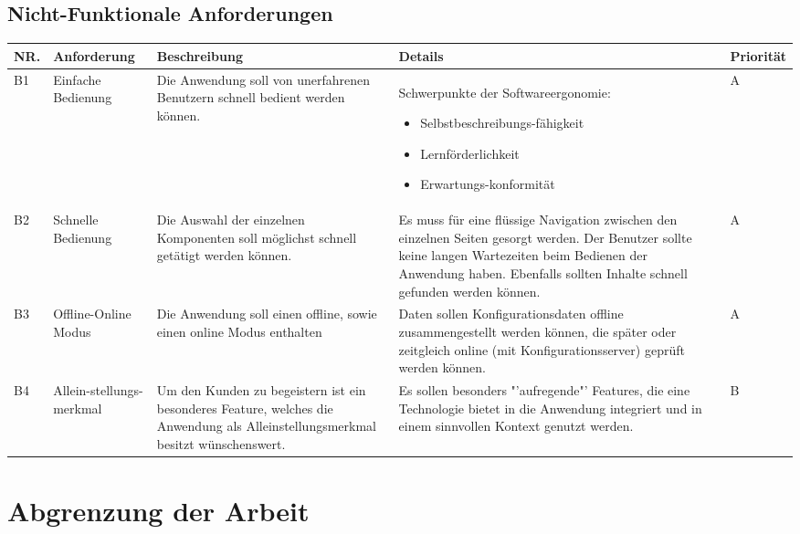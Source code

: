 \subsection{Nicht-Funktionale Anforderungen}
\begin{tabular}[H]{| p{0.5cm} | p{2.2cm} | p{4.5cm} | p{5.3cm} | p{1.3cm} |}
\toprule[2pt] \rowcolor{dunkelgrau}
\hline
  NR. & Anforderung & Beschreibung & Details & Priorität \\
  \hline
  B1 & Einfache \newline Bedienung & Die Anwendung soll von unerfahrenen Benutzern schnell bedient werden können.& Schwerpunkte der Softwareergonomie\cite{bib:softwareErgonomie}: 
  \begin{itemize}
        \item Selbstbeschreibungs-fähigkeit
        \item Lernförderlichkeit
        \item Erwartungs-konformität
     \end{itemize}
   & A \\
  \hline
  B2 & Schnelle Bedienung & Die Auswahl der einzelnen Komponenten soll möglichst schnell getätigt werden können. & Es muss für eine flüssige Navigation zwischen den einzelnen Seiten gesorgt werden. Der Benutzer sollte keine langen Wartezeiten beim Bedienen der Anwendung haben. Ebenfalls sollten Inhalte schnell gefunden werden können. & A \\
  \hline
    B3 & Offline-Online Modus & Die Anwendung soll einen offline, sowie einen online Modus enthalten & Daten sollen Konfigurationsdaten offline zusammengestellt werden können, die später oder zeitgleich online (mit Konfigurationsserver) geprüft werden können. & A \\
    \hline
    B4 & Allein-stellungs-merkmal & Um den Kunden zu begeistern ist ein besonderes Feature, welches die Anwendung als Alleinstellungsmerkmal besitzt wünschenswert.& Es sollen besonders "'aufregende"' Features, die eine Technologie bietet in die Anwendung integriert und in einem sinnvollen Kontext genutzt werden.  & B\\
    \hline
\bottomrule[2pt]
\end{tabular}

\section{Abgrenzung der Arbeit}




